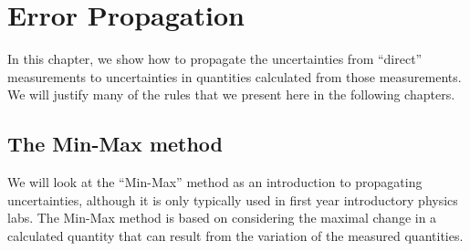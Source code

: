 %
\chapter{Error Propagation}
\label{chap:ErrorPropagation}
In this chapter, we show how to propagate the uncertainties from ``direct'' measurements to uncertainties in quantities calculated from those measurements. We will justify many of the rules that we present here in the following chapters.

\section{The Min-Max method}
We will look at the ``Min-Max'' method as an introduction to propagating uncertainties, although it is only typically used in first year introductory physics labs. The Min-Max method is based on considering the maximal change in a calculated quantity that can result from the variation of the measured quantities.

